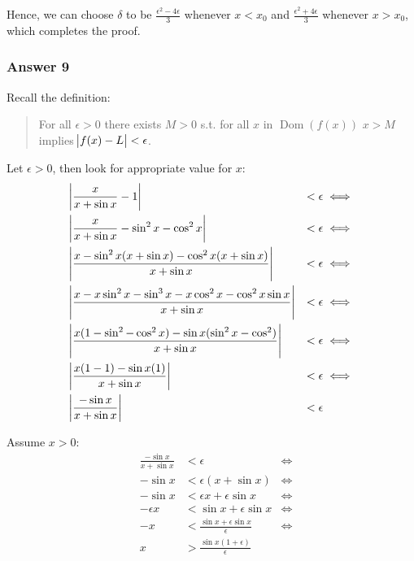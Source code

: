 \documentclass[a4paper]{article}
\DeclareMathOperator{\Dom}{Dom}
\begin{document}
Hence, we can choose \(\delta\) to be \(\frac{\epsilon^2 - 4\epsilon}{3}\)
whenever \(x < x_0\) and \(\frac{\epsilon^2 + 4\epsilon}{3}\) whenever
\(x > x_0\), which completes the proof.

\subsubsection{Answer 9}
\label{sec:orgheadline11}
Recall the definition:
\begin{quote}
For all \(\epsilon > 0\) there exists \(M > 0\) s.t. for all \(x\) in
\(\Dom(f(x))\) \(x > M\) implies \(\abs{f(x) - L} < \epsilon\).
\end{quote}

Let \(\epsilon > 0\), then look for appropriate value for \(x\):
\begin{align*}
  &\abs{\frac{x}{x + \sin x} - 1}                   &< \epsilon &\iff \\
  &\abs{\frac{x}{x + \sin x} - \sin^2 x - \cos^2 x} &< \epsilon &\iff \\
  &\abs{\frac{x - \sin^2 x(x + \sin x) -
      \cos^2 x(x + \sin x)}{x + \sin x}}            &< \epsilon &\iff \\
  &\abs{\frac{x - x\sin^2 x - \sin^3 x -
      x\cos^2 x - \cos^2 x \sin x}{x + \sin x}}     &< \epsilon &\iff \\
  &\abs{\frac{x(1 - \sin^2 - \cos^2 x) -
      \sin x(\sin^2 x - \cos^2)}{x + \sin x}}       &< \epsilon &\iff \\
  &\abs{\frac{x(1 - 1) - \sin x(1)}{x + \sin x}}    &< \epsilon &\iff \\
  &\abs{\frac{-\sin x}{x + \sin x}}                 &< \epsilon \\
\end{align*}

Assume \(x > 0\):
\begin{align*}
  &\frac{-\sin x}{x + \sin x} &< \epsilon &\iff \\
  &-\sin x                    &< \epsilon(x + \sin x) &\iff \\
  &-\sin x                    &< \epsilon x + \epsilon \sin x &\iff \\
  &-\epsilon x                &< \sin x + \epsilon \sin x &\iff \\
  &-x                         &< \frac{\sin x + \epsilon \sin x}{\epsilon} &\iff \\
  &x                          &> \frac{\sin x(1 + \epsilon)}{\epsilon}
\end{align*}
\end{document}
